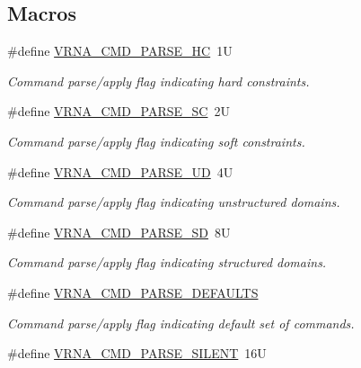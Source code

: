 \subsection*{Macros}
\begin{DoxyCompactItemize}
\item 
\#define \mbox{\hyperlink{group__file__utils_gac54dec838d7b6bebd5df85f71702d324}{V\+R\+N\+A\+\_\+\+C\+M\+D\+\_\+\+P\+A\+R\+S\+E\+\_\+\+HC}}~1U
\begin{DoxyCompactList}\small\item\em Command parse/apply flag indicating hard constraints. \end{DoxyCompactList}\item 
\#define \mbox{\hyperlink{group__file__utils_ga8cad3c1f83e6f149829c49a186a83e21}{V\+R\+N\+A\+\_\+\+C\+M\+D\+\_\+\+P\+A\+R\+S\+E\+\_\+\+SC}}~2U
\begin{DoxyCompactList}\small\item\em Command parse/apply flag indicating soft constraints. \end{DoxyCompactList}\item 
\#define \mbox{\hyperlink{group__file__utils_ga6c6409780698826b04ebfed9151d7649}{V\+R\+N\+A\+\_\+\+C\+M\+D\+\_\+\+P\+A\+R\+S\+E\+\_\+\+UD}}~4U
\begin{DoxyCompactList}\small\item\em Command parse/apply flag indicating unstructured domains. \end{DoxyCompactList}\item 
\#define \mbox{\hyperlink{group__file__utils_gaf5e20210173cdb83bf70256a454f284b}{V\+R\+N\+A\+\_\+\+C\+M\+D\+\_\+\+P\+A\+R\+S\+E\+\_\+\+SD}}~8U
\begin{DoxyCompactList}\small\item\em Command parse/apply flag indicating structured domains. \end{DoxyCompactList}\item 
\#define \mbox{\hyperlink{group__file__utils_ga0a6c88e21e366dca14958d69cd024008}{V\+R\+N\+A\+\_\+\+C\+M\+D\+\_\+\+P\+A\+R\+S\+E\+\_\+\+D\+E\+F\+A\+U\+L\+TS}}
\begin{DoxyCompactList}\small\item\em Command parse/apply flag indicating default set of commands. \end{DoxyCompactList}\item 
\#define \mbox{\hyperlink{group__file__utils_ga8d6c5d6d2936464a11f542b843bd1610}{V\+R\+N\+A\+\_\+\+C\+M\+D\+\_\+\+P\+A\+R\+S\+E\+\_\+\+S\+I\+L\+E\+NT}}~16U
\item 

\end{DoxyCompactItemize}
